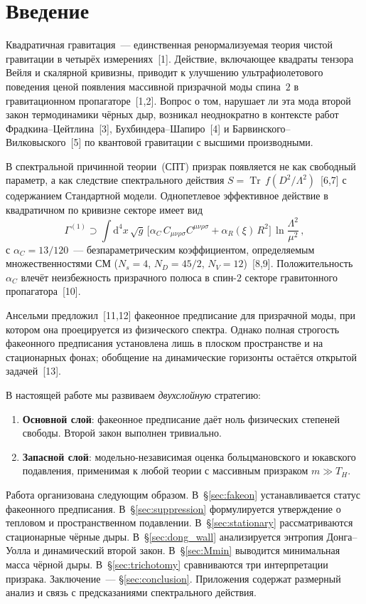 \documentclass[12pt,a4paper]{article}
\newcommand{\dd}{\mathrm{d}}
\newcommand{\Tr}{\operatorname{Tr}}
\newcommand{\Lam}{\Lambda}
\newcommand{\Thr}{T_{\!H}}
\newcommand{\Weylsq}{C_{\mu\nu\rho\sigma}C^{\mu\nu\rho\sigma}}
\theoremstyle{plain}
\theoremstyle{definition}
\begin{document}
\tableofcontents

\section{Введение}\label{sec:intro}

Квадратичная гравитация~--- единственная ренормализуемая теория
чистой гравитации в четырёх измерениях~[1]. Действие, включающее
квадраты тензора Вейля и скалярной кривизны, приводит к улучшению
ультрафиолетового поведения ценой появления массивной призрачной
моды спина~$2$ в гравитационном пропагаторе~[1,2]. Вопрос о том,
нарушает ли эта мода второй закон термодинамики чёрных дыр, возникал
неоднократно в контексте работ Фрадкина--Цейтлина~[3],
Бухбиндера--Шапиро~[4] и Барвинского--Вилковыского~[5]
по квантовой гравитации с высшими производными.

В спектральной причинной теории~(СПТ) призрак появляется не как
свободный параметр, а как следствие спектрального действия
$S = \Tr\,f(D^2/\Lam^2)$~[6,7] с содержанием Стандартной модели.
Однопетлевое эффективное действие в квадратичном по кривизне
секторе имеет вид
\begin{equation}\label{eq:Gamma}
  \Gamma^{(1)} \supset \int\!\dd^4x\,\sqrt{g}\,
  \bigl[\alpha_C\,\Weylsq
  + \alpha_R(\xi)\, R^2\bigr]\,\ln\frac{\Lam^2}{\mu^2}\,,
\end{equation}
с $\alpha_C = 13/120$~--- безпараметрическим коэффициентом, определяемым
множественностями СМ ($N_s = 4$, $N_D = 45/2$, $N_V = 12$)~[8,9].
Положительность $\alpha_C$ влечёт неизбежность призрачного полюса
в спин-$2$ секторе гравитонного пропагатора~[10].

Ансельми предложил~[11,12] факеонное предписание для призрачной моды,
при котором она проецируется из физического спектра. Однако полная
строгость факеонного предписания установлена лишь в плоском пространстве
и на стационарных фонах; обобщение на динамические горизонты остаётся
открытой задачей~[13].

В настоящей работе мы развиваем \emph{двухслойную} стратегию:
\begin{enumerate}[label=(\roman*)]
  \item \textbf{Основной слой}: факеонное предписание даёт ноль
    физических степеней свободы. Второй закон выполнен тривиально.
  \item \textbf{Запасной слой}: модельно-независимая оценка
    больцмановского и юкавского подавления, применимая к любой
    теории с массивным призраком $m \gg \Thr$.
\end{enumerate}
Работа организована следующим образом. В~\S\ref{sec:fakeon}
устанавливается статус факеонного предписания. В~\S\ref{sec:suppression}
формулируется утверждение о тепловом и пространственном подавлении.
В~\S\ref{sec:stationary} рассматриваются стационарные чёрные дыры.
В~\S\ref{sec:dong_wall} анализируется энтропия Донга--Уолла
и динамический второй закон. В~\S\ref{sec:Mmin} выводится минимальная
масса чёрной дыры. В~\S\ref{sec:trichotomy} сравниваются три
интерпретации призрака. Заключение~--- \S\ref{sec:conclusion}.
Приложения содержат размерный анализ и связь с предсказаниями
спектрального действия.
\end{document}
